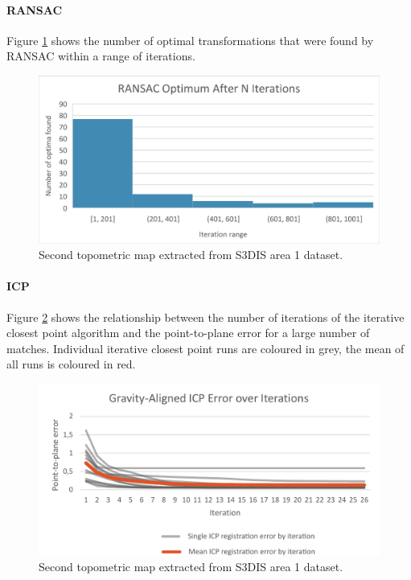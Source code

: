 \paragraph{RANSAC}
Figure \ref{fig:ransac_results} shows the number of optimal transformations that were found by RANSAC within a range of iterations. 

\begin{figure}[h]
    \centering
    \includegraphics*[width=\textwidth]{./fig/ransac_optima.pdf}
    \caption{Second topometric map extracted from S3DIS area 1 dataset.}
    \label{fig:ransac_results}
\end{figure}

\paragraph{ICP}
Figure \ref{fig:icp_convergence} shows the relationship between the number of iterations of the iterative closest point algorithm and the point-to-plane error for a large number of matches. Individual iterative closest point runs are coloured in grey, the mean of all runs is coloured in red.

\begin{figure}[h]
    \centering
    \includegraphics*[width=\textwidth]{./fig/icp_convergence.pdf}
    \caption{Second topometric map extracted from S3DIS area 1 dataset.}
    \label{fig:icp_convergence}
\end{figure}

